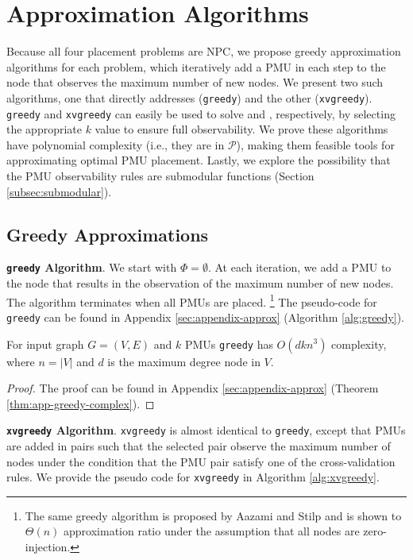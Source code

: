 \section{Approximation Algorithms}
\label{sec:approx}

Because all four placement problems are NPC, we propose greedy approximation algorithms for each problem, which iteratively add 
a PMU in each step to the node that observes the maximum number of new nodes. We present two such algorithms, one that directly addresses \maxinc ({\tt greedy}) and the other 
\xvalpart ({\tt xvgreedy}). {\tt greedy} and {\tt xvgreedy} can easily be used to solve \full and \xvals, respectively, by selecting the appropriate $k$ value to ensure full observability.
We prove these algorithms have polynomial complexity (i.e., they are in $\mathcal{P}$), making them feasible tools for approximating optimal PMU placement.
Lastly, we explore the possibility that the PMU observability rules are submodular functions (Section \ref{subsec:submodular}).

\subsection{Greedy Approximations}
\label{sec:greedy-approx}

{\bf {\tt greedy} Algorithm}. We start with $\Phi = \emptyset$.  At each iteration, we add a PMU to the node that results in the observation of the maximum number of 
new nodes. The algorithm terminates when all PMUs are placed.  {\footnote {\small The same greedy algorithm is proposed by Aazami and Stilp \cite{Aazami07} and
is shown to  $\Theta(n)$ approximation ratio under the assumption that all nodes are zero-injection.}}
The pseudo-code for {\tt greedy} can be found in Appendix \ref{sec:appendix-approx} (Algorithm \ref{alg:greedy}).

\begin{theorem}
For input graph $G=(V,E)$ and $k$ PMUs {\tt greedy} has $O(dkn^3)$ complexity, where $n=|V|$ and $d$ is the maximum degree node in $V$.
\label{thm:greedy-complex}
\end{theorem}
\begin{proof}
The proof can be found in Appendix \ref{sec:appendix-approx} (Theorem \ref{thm:app-greedy-complex}).
\end{proof}

{\bf {\tt xvgreedy} Algorithm}. {\tt xvgreedy} is almost identical to {\tt greedy}, except that PMUs are added in pairs such that the selected pair observe
the maximum number of nodes under the condition that the PMU pair satisfy one of the cross-validation rules. 
We provide the pseudo code for {\tt xvgreedy} in Algorithm \ref{alg:xvgreedy}.

